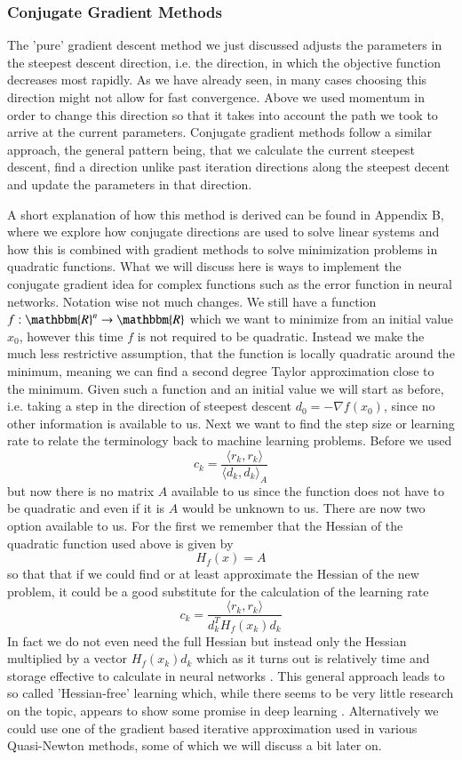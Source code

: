\documentclass[preprint,12pt,3p]{elsarticle}
\begin{document}
\subsubsection{Conjugate Gradient Methods}

The 'pure' gradient descent method we just discussed adjusts the parameters in the steepest descent direction, i.e. the direction, in which the objective function decreases most rapidly. As we have already seen, in many cases choosing this direction might not allow for fast convergence. Above we used momentum in order to change this direction so that it takes into account the path we took to arrive at the current parameters. Conjugate gradient methods follow a similar approach, the general pattern being, that we calculate the current steepest descent, find a direction unlike past iteration directions along the steepest decent and update the parameters in that direction.

A short explanation of how this method is derived can be found in Appendix B, where we explore how conjugate directions are used to solve linear systems and how this is combined with gradient methods to solve minimization problems in quadratic functions. What we will discuss here is ways to implement the conjugate gradient idea for complex functions such as the error function in neural networks. Notation wise not much changes. We still have a function $f:\mathbbm{R}^n\rightarrow\mathbbm{R}$ which we want to minimize from an initial value $x_0$, however this time $f$ is not required to be quadratic. Instead we make the much less restrictive assumption, that the function is locally quadratic around the minimum, meaning we can find a second degree Taylor approximation close to the minimum. Given such a function and an initial value we will start as before, i.e. taking a step in the direction of steepest descent $d_0=-\nabla f(x_0)$, since no other information is available to us. Next we want to find the step size or learning rate to relate the terminology back to machine learning problems. Before we used 
$$c_k=\frac{\langle r_k, r_k\rangle}{\langle d_k,d_k\rangle_A}$$
but now there is no matrix $A$ available to us since the function does not have to be quadratic and even if it is $A$ would be unknown to us. There are now two option available to us. For the first we remember that the Hessian of the quadratic function used above is given by 
$$H_f(x)=A$$
so that that if we could find or at least approximate the Hessian of the new problem, it could be a good substitute for the calculation of the learning rate
$$c_k=\frac{\langle r_k, r_k\rangle}{d_k^TH_f(x_k)d_k}$$
In fact we do not even need the full Hessian but instead only the Hessian multiplied by a vector $H_f(x_k)d_k$ which as it turns out is relatively time and storage effective to calculate in neural networks \cite{pearlmutter1994fast}. This general approach leads to so called 'Hessian-free' learning which, while there seems to be very little research on the topic, appears to show some promise in deep learning \cite{martens2010deep}. Alternatively we could use one of the gradient based iterative approximation used in various Quasi-Newton methods, some of which we will discuss a bit later on. 
\end{document}
